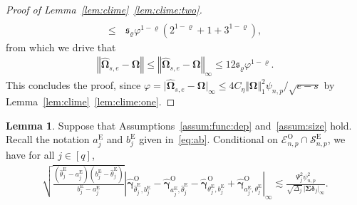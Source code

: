 \documentclass[11pt, a4paper]{article}
\newcommand{\mc}{\mathcal}
\renewcommand{\l}{\left}
\renewcommand{\r}{\right}
\def\wh{\widehat}
\newcommand{\cp}{\theta}
\newcommand{\tE}{\text{E}}
\newcommand{\tO}{\text{O}}
\theoremstyle{definition}
\theoremstyle{definition}
\theoremstyle{definition}
\newtheorem{lem}[thm]{Lemma}
\theoremstyle{definition}
\theoremstyle{definition}
\theoremstyle{remark}
\theoremstyle{definition}
\theoremstyle{definition}
\theoremstyle{definition}
\begin{document}
\begin{proof}[Proof of Lemma~\ref{lem:clime}~\ref{lem:clime:two}]
\begin{align*}
	\\
	\le&  \, \mathfrak{s}_\varrho \varphi^{1 - \varrho} \l(2^{1 - \varrho} + 1 + 3^{1 - \varrho} \r),
	\end{align*}
	from which we drive that
	\begin{align*}
	\l\Vert \wh{\bm\Omega}_{s, e} - \bm\Omega \r\Vert
	\le \l\Vert \wh{\bm\Omega}_{s, e} - \bm\Omega \r\Vert_\infty
	\le 12\mathfrak{s}_\varrho \varphi^{1 - \varrho}.
	\end{align*}
	This concludes the proof, since $\varphi = \vert \wh{\bm\Omega}_{s, e} - \bm\Omega \vert_\infty \le 4 C_\eta \Vert \bm\Omega \Vert_1^2 \psi_{n, p}/\sqrt{e-s}$ by Lemma~\ref{lem:clime}~\ref{lem:clime:one}. 
\end{proof}


\begin{lem}
	\label{lem:gamma:two}
	Suppose that Assumptions~\ref{assum:func:dep} and~\ref{assum:size} hold.
	Recall the notation $a^{\tE}_j$ and $b^{\tE}_j$ given in~\eqref{eq:ab}.
	Conditional on $\mc E^{\tO}_{n, p} \cap \mc S^{\tE}_{n, p}$, we have for all $j \in [q]$,
	\begin{align*}
	\sqrt{\frac{(\wh\cp^{\tE}_j - a^{\tE}_j)(b^{\tE}_j - \wh\cp^{\tE}_j)}{b^{\tE}_j - a^{\tE}_j}} 	\l\vert \wh{\bm\gamma}^{\tO}_{\wh\cp^{\tE}_j, b^{\tE}_j} - \wh{\bm\gamma}^{\tO}_{a^{\tE}_j, \wh\cp^{\tE}_j} - \wh{\bm\gamma}^{\tO}_{\cp^{\tE}_j, b^{\tE}_j} + \wh{\bm\gamma}^{\tO}_{a^{\tE}_j, \cp^{\tE}_j} \r\vert_\infty 
	\lesssim \frac{\Psi_j^2 \psi_{n, p}^2}{\sqrt{\Delta_j} \,\vert \bm\Sigma \bm\delta_j \vert_\infty}.
	\end{align*}
\end{lem}
\end{document}
